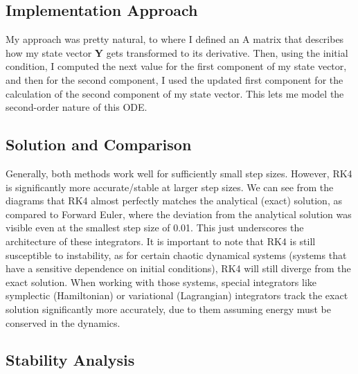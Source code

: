 \documentclass[11pt]{article}
\begin{document}
\subsection{Implementation Approach}\label{implementation-approach}

My approach was pretty natural, to where I defined an A matrix that
describes how my state vector \textbf{Y} gets transformed to its
derivative. Then, using the initial condition, I computed the next value
for the first component of my state vector, and then for the second
component, I used the updated first component for the calculation of the
second component of my state vector. This lets me model the second-order
nature of this ODE.

\subsection{Solution and Comparison}\label{solution-and-comparison}

Generally, both methods work well for sufficiently small step sizes.
However, RK4 is significantly more accurate/stable at larger step sizes.
We can see from the diagrams that RK4 almost perfectly matches the
analytical (exact) solution, as compared to Forward Euler, where the
deviation from the analytical solution was visible even at the smallest
step size of 0.01. This just underscores the architecture of these
integrators. It is important to note that RK4 is still susceptible to
instability, as for certain chaotic dynamical systems (systems that have
a sensitive dependence on initial conditions), RK4 will still diverge
from the exact solution. When working with those systems, special
integrators like symplectic (Hamiltonian) or variational (Lagrangian)
integrators track the exact solution significantly more accurately, due
to them assuming energy must be conserved in the dynamics.

\subsection{Stability Analysis}\label{stability-analysis}
\end{document}
